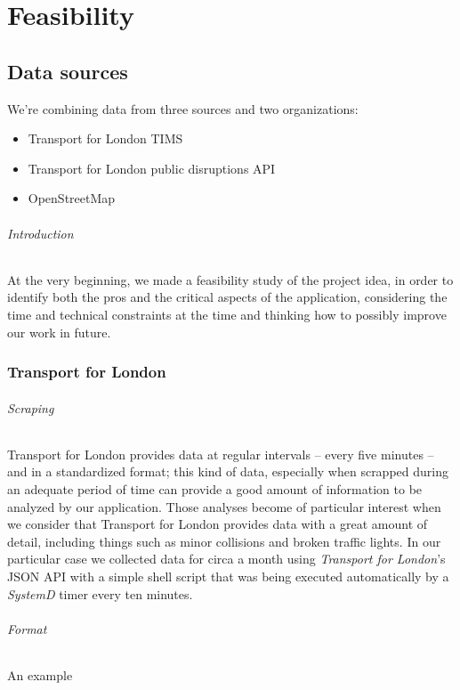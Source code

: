 
\part{Feasibility}
\chapter{Data sources}

We’re combining data from three sources and two organizations:

\begin{itemize}
	\item Transport for London TIMS
	\item Transport for London public disruptions API
	\item OpenStreetMap
\end{itemize}

\paragraph{Introduction}
At the very beginning, we made a feasibility study of the project idea, in 
order to identify both the pros and the critical aspects of the application, 
considering the time and technical constraints at the time and thinking how to 
possibly improve our work in future.

\section{Transport for London}

\paragraph{Scraping}
Transport for London provides data at regular intervals – every five 
minutes –  and in a standardized format; this kind of data, especially when 
scrapped during an adequate period of time can provide a good amount of 
information to be analyzed by our application. Those analyses become of 
particular interest when we consider that Transport for London provides 
data with a great amount of detail, including things such as minor collisions 
and broken traffic lights. In our particular case we collected data for circa a 
month using \textit{Transport for London}’s JSON API with a simple shell script 
that was being executed 
automatically by a \textit{SystemD} timer every ten minutes.

\paragraph{Format}
An example 

